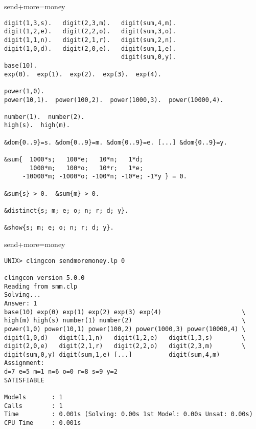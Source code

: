 \begin{frame}[fragile,shrink=1]{send+more=money}
\begin{lstlisting}
digit(1,3,s).   digit(2,3,m).   digit(sum,4,m).
digit(1,2,e).   digit(2,2,o).   digit(sum,3,o).
digit(1,1,n).   digit(2,1,r).   digit(sum,2,n).
digit(1,0,d).   digit(2,0,e).   digit(sum,1,e).
                                digit(sum,0,y).
base(10).
exp(0).  exp(1).  exp(2).  exp(3).  exp(4).

power(1,0).
power(10,1).  power(100,2).  power(1000,3).  power(10000,4).

number(1).  number(2).
high(s).  high(m).

&dom{0..9}=s. &dom{0..9}=m. &dom{0..9}=e. [...] &dom{0..9}=y.

&sum{  1000*s;   100*e;   10*n;   1*d;
       1000*m;   100*o;   10*r;   1*e;
     -10000*m; -1000*o; -100*n; -10*e; -1*y } = 0.

&sum{s} > 0.  &sum{m} > 0.

&distinct{s; m; e; o; n; r; d; y}.

&show{s; m; e; o; n; r; d; y}.
\end{lstlisting}
\end{frame}
\begin{frame}[fragile]{send+more=money}
\scriptsize\medskip
\begin{lstlisting}
UNIX> clingcon sendmoremoney.lp 0

clingcon version 5.0.0
Reading from smm.clp
Solving...
Answer: 1
base(10) exp(0) exp(1) exp(2) exp(3) exp(4)                      \
high(m) high(s) number(1) number(2)                              \
power(1,0) power(10,1) power(100,2) power(1000,3) power(10000,4) \
digit(1,0,d)   digit(1,1,n)   digit(1,2,e)   digit(1,3,s)        \
digit(2,0,e)   digit(2,1,r)   digit(2,2,o)   digit(2,3,m)        \
digit(sum,0,y) digit(sum,1,e) [...]          digit(sum,4,m)
Assignment:
d=7 e=5 m=1 n=6 o=0 r=8 s=9 y=2
SATISFIABLE

Models       : 1
Calls        : 1
Time         : 0.001s (Solving: 0.00s 1st Model: 0.00s Unsat: 0.00s)
CPU Time     : 0.001s
\end{lstlisting}
\end{frame}
%
